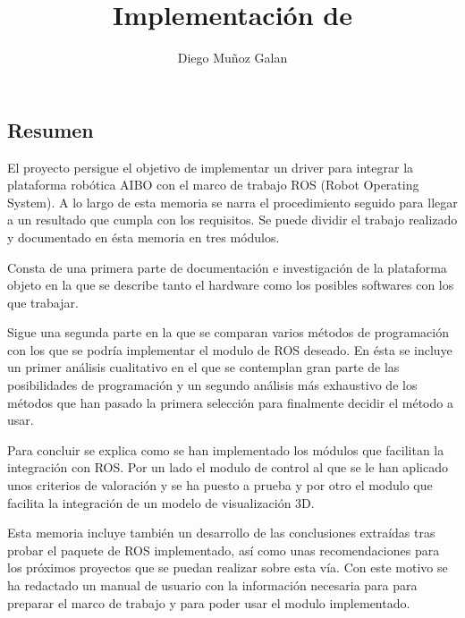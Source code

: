 \documentclass[12pt,a4paper,final,twoside]{book}
\title{Implementación de }
\author{Diego Muñoz Galan}
\begin{document}
\maketitle
\thispagestyle{empty}

\newpage
\paragraph{}
\thispagestyle{empty}
\cleardoublepage

\setcounter{page}{1}
\begin{center}
\chapter*{Resumen}
\end{center}
\thispagestyle{fancy}
El proyecto persigue el objetivo de implementar un driver para integrar la plataforma robótica AIBO con el marco de trabajo ROS (Robot Operating System). A lo largo de esta memoria se narra el procedimiento seguido para llegar a un resultado que cumpla con los requisitos. 
Se puede dividir el trabajo realizado y documentado en ésta memoria en tres módulos.

Consta de una primera parte de documentación e investigación de la plataforma objeto en la que se describe tanto el hardware como los posibles softwares con los que trabajar.

Sigue una segunda parte en la que se comparan varios métodos de programación con los que se podría implementar el modulo de ROS deseado. En ésta se incluye un primer análisis cualitativo en el que se contemplan gran parte de las posibilidades de programación y un segundo análisis más exhaustivo de los métodos que han pasado la primera selección para finalmente decidir el método a usar.

Para concluir se explica como se han implementado los módulos que facilitan la integración con ROS. Por un lado el modulo de control al que se le han aplicado unos criterios de valoración y se ha puesto a prueba y por otro el modulo que facilita la integración de un modelo de visualización 3D.

Esta memoria incluye también un desarrollo de las conclusiones extraídas tras probar el paquete de ROS implementado, así como unas recomendaciones para los próximos proyectos que se puedan realizar sobre esta vía.
Con este motivo se ha redactado un manual de usuario con la información necesaria para para preparar el marco de trabajo y para poder usar el modulo implementado.
\end{document}
